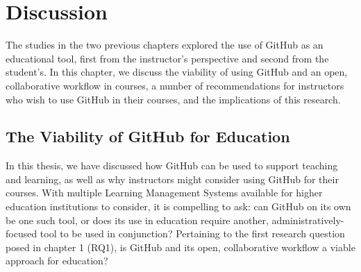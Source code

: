 \chapter{Discussion}
The studies in the two previous chapters explored the use of GitHub as an educational tool, first from the instructor's perspective and second from the student's. In this chapter, we discuss the viability of using GitHub and an open, collaborative workflow in courses, a number of recommendations for instructors who wish to use GitHub in their courses, and the implications of this research.

\section{The Viability of GitHub for Education}
In this thesis, we have discussed how GitHub can be used to support teaching and learning, as well as why instructors might consider using GitHub for their courses. With multiple Learning Management Systems available for higher education institutions to consider, it is compelling to ask: can GitHub on its own be one such tool, or does its use in education require another, administratively-focused tool to be used in conjunction? Pertaining to the first research question posed in chapter 1 (RQ1), is GitHub and its open, collaborative workflow a viable approach for education?

